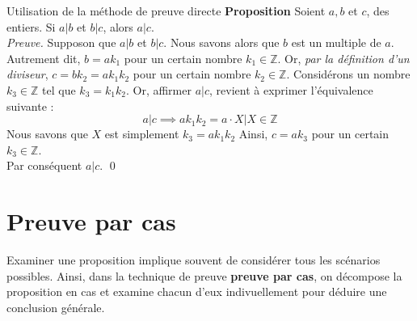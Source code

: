 \documentclass[16pt]{report}
\begin{document}
\begin{multicols*}{2}
            \begin{Preuve}{Utilisation de la méthode de preuve directe}{} 
                \textbf{Proposition} \quad Soient $a, b$ et $c$, des entiers. Si $a|b$ et $b|c$, alors $a|c$. 
                \vspace{1em}\\ 
                \textit{Preuve.} \quad Supposon que $a|b$ et $b|c$. Nous savons alors que $b$ est un multiple de 
                $a$. Autrement dit, $b = ak_1$ pour un certain nombre $k_1 \in \mathbb{Z}$. Or, \textit{par 
                la définition d'un diviseur}, 
                $c = bk_2 = ak_1k_2$ pour un certain nombre $k_2 \in \mathbb{Z}$. 
                Considérons un nombre $k_3 \in \mathbb{Z}$ tel que $k_3 = k_1k_2$. Or, affirmer $a|c$, revient 
                à exprimer l'équivalence suivante : 
                \[ a|c \implies  ak_1k_2 = a\cdot X  | X \in \mathbb{Z} \]
                Nous savons que $X$ est simplement $k_3 = ak_1k_2$ 
                Ainsi, $c = ak_3$ pour un certain $k_3 \in \mathbb{Z}$. 
                \vspace{1em} \\
                Par conséquent $a|c$. \qed
                
            \end{Preuve}
           



        
            \section{\textcolor{myp}{\textbf{Preuve par cas}}}

            Examiner une proposition implique souvent de considérer tous les scénarios possibles. Ainsi, 
            dans la technique de preuve \textbf{preuve par cas}, on décompose la proposition en cas et examine 
            chacun d'eux indivuellement pour déduire une conclusion générale. 


            \begin{center}
            \noindent{}
\end{center}
\end{multicols*}
\end{document}
